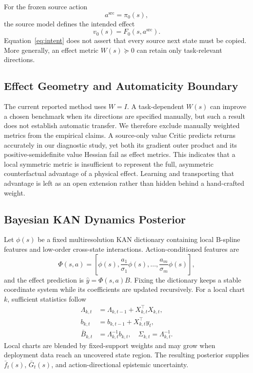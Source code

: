 \documentclass[letterpaper]{article}
\begin{document}
For the frozen source action
\begin{equation}
a^{\mathrm{src}}=\pi_0(s),
\end{equation}
the source model defines the intended effect
\begin{equation}
v_0(s)=F_0(s,a^{\mathrm{src}}).
\label{eq:intent}
\end{equation}
Equation~\eqref{eq:intent} does not assert that every source next state must be
copied.  More generally, an effect metric $W(s)\succeq 0$ can retain only
task-relevant directions.

\subsection{Effect Geometry and Automaticity Boundary}

The current reported method uses $W=I$.  A task-dependent $W(s)$ can improve a
chosen benchmark when its directions are specified manually, but such a result
does not establish automatic transfer.  We therefore exclude manually weighted
metrics from the empirical claims.  A source-only value Critic predicts returns
accurately in our diagnostic study, yet both its gradient outer product and its
positive-semidefinite value Hessian fail as effect metrics.  This indicates that
a local symmetric metric is insufficient to represent the full, asymmetric
counterfactual advantage of a physical effect.  Learning and transporting that
advantage is left as an open extension rather than hidden behind a hand-crafted
weight.

\subsection{Bayesian KAN Dynamics Posterior}

Let $\phi(s)$ be a fixed multiresolution KAN dictionary containing local
B-spline features and low-order cross-state interactions.  Action-conditioned
features are
\begin{equation}
\Phi(s,a)=\left[\phi(s),\frac{a_1}{\sigma_1}\phi(s),\ldots,
\frac{a_m}{\sigma_m}\phi(s)\right],
\end{equation}
and the effect prediction is $\hat y=\Phi(s,a)B$.  Fixing the dictionary keeps a
stable coordinate system while its coefficients are updated recursively.
For a local chart $k$, sufficient statistics follow
\begin{align}
\Lambda_{k,t}&=\Lambda_{k,t-1}+X_{k,t}^{\top}X_{k,t},\\
b_{k,t}&=b_{k,t-1}+X_{k,t}^{\top}y_t,\\
\bar B_{k,t}&=\Lambda_{k,t}^{-1}b_{k,t},\quad
\Sigma_{k,t}=\Lambda_{k,t}^{-1}.
\end{align}
Local charts are blended by fixed-support weights and may grow when deployment
data reach an uncovered state region.  The resulting posterior supplies
$\bar f_t(s)$, $\bar G_t(s)$, and action-directional epistemic uncertainty.
\end{document}
